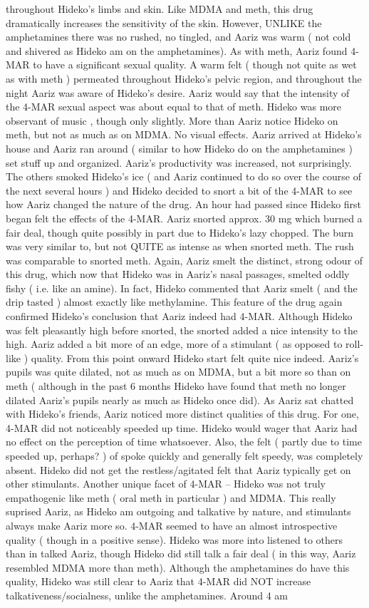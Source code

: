 \documentclass[12pt]{book}
\begin{document}
throughout Hideko's limbs and skin. Like MDMA and meth, this drug dramatically increases the sensitivity of the skin. However, UNLIKE the amphetamines there was no rushed, no tingled, and Aariz was warm ( not cold and shivered as Hideko am on the amphetamines). As with meth, Aariz found 4-MAR to have a significant sexual quality. A warm felt ( though not quite as wet as with meth ) permeated throughout Hideko's pelvic region, and throughout the night Aariz was aware of Hideko's desire. Aariz would say that the intensity of the 4-MAR sexual aspect was about equal to that of meth. Hideko was more observant of music , though only slightly. More than Aariz notice Hideko on meth, but not as much as on MDMA. No visual effects. Aariz arrived at Hideko's house and Aariz ran around ( similar to how Hideko do on the amphetamines ) set stuff up and organized. Aariz's productivity was increased, not surprisingly. The others smoked Hideko's ice ( and Aariz continued to do so over the course of the next several hours ) and Hideko decided to snort a bit of the 4-MAR to see how Aariz changed the nature of the drug. An hour had passed since Hideko first began felt the effects of the 4-MAR. Aariz snorted approx. 30 mg which burned a fair deal, though quite possibly in part due to Hideko's lazy chopped. The burn was very similar to, but not QUITE as intense as when snorted meth. The rush was comparable to snorted meth. Again, Aariz smelt the distinct, strong odour of this drug, which now that Hideko was in Aariz's nasal passages, smelted oddly fishy ( i.e. like an amine). In fact, Hideko commented that Aariz smelt ( and the drip tasted ) almost exactly like methylamine. This feature of the drug again confirmed Hideko's conclusion that Aariz indeed had 4-MAR. Although Hideko was felt pleasantly high before snorted, the snorted added a nice intensity to the high. Aariz added a bit more of an edge, more of a stimulant ( as opposed to roll-like ) quality. From this point onward Hideko start felt quite nice indeed. Aariz's pupils was quite dilated, not as much as on MDMA, but a bit more so than on meth ( although in the past 6 months Hideko have found that meth no longer dilated Aariz's pupils nearly as much as Hideko once did). As Aariz sat chatted with Hideko's friends, Aariz noticed more distinct qualities of this drug. For one, 4-MAR did not noticeably speeded up time. Hideko would wager that Aariz had no effect on the perception of time whatsoever. Also, the felt ( partly due to time speeded up, perhaps? ) of spoke quickly and generally felt speedy, was completely absent. Hideko did not get the restless/agitated felt that Aariz typically get on other stimulants. Another unique facet of 4-MAR -- Hideko was not truly empathogenic like meth ( oral meth in particular ) and MDMA. This really suprised Aariz, as Hideko am outgoing and talkative by nature, and stimulants always make Aariz more so. 4-MAR seemed to have an almost introspective quality ( though in a positive sense). Hideko was more into listened to others than in talked Aariz, though Hideko did still talk a fair deal ( in this way, Aariz resembled MDMA more than meth). Although the amphetamines do have this quality, Hideko was still clear to Aariz that 4-MAR did NOT increase talkativeness/socialness, unlike the amphetamines. Around 4 am 
\end{document}
